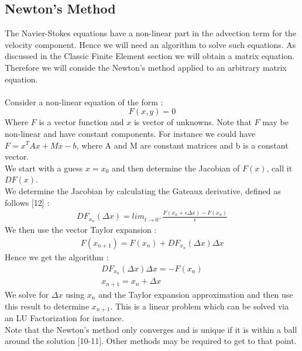 \documentclass[11pt,twoside,a4paper]{article}
\begin{document}
\subsection{Newton's Method}
The Navier-Stokes equations have a non-linear part in the advection term for the velocity component. Hence we will need an algorithm to solve such equations. As discussed in the Classic Finite Element section we will obtain a matrix equation. Therefore we will conside the Newton's method applied to an arbitrary matrix equation.\\
\\
Consider a non-linear equation of the form :
$$
F(x,y) = 0
$$
Where $F$ is a vector function and $x$ is vector of unknowns. Note that $F$ may be non-linear and have constant components.
For instance we could have $ F = x^T A x + M x - b$, where A and M are constant matrices and b is a constant vector.\\
We start with a guess $x = x_0$ and then determine the Jacobian of $F(x)$, call it $DF(x)$.\\
We determine the Jacobian by calculating the Gateaux derivative, defined as follows [12] :
\begin{align}
DF_{x_n}(\Delta x) = lim_{t \rightarrow 0^+} \frac{F(x_n+ \epsilon \Delta x) - F(x_n)}{\epsilon}
\end{align}
We then use the vector Taylor expansion :
\begin{align*}
F(x_{n+1}) = F(x_n) + DF_{x_n}(\Delta x) \Delta x
\end{align*}
Hence we get the algorithm :
\begin{align}
DF_{x_n}(\Delta x) \Delta x = - F(x_n)\\
x_{n+1} = x_n + \Delta x
\end{align}
We solve for $\Delta x$ using $x_n$ and the Taylor expansion approximation and then use this result to determine $x_{n+1}$.
This is a linear problem which can be solved via an LU Factorization for instance.\\
Note that the Newton's method only converges and is unique if it is within a ball around the solution [10-11]. Other methods may be required to get to that point.
\end{document}

